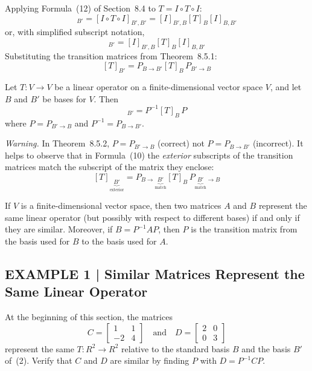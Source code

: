 \documentclass{article}
\begin{document}
Applying Formula~(12) of Section~8.4 to $T = I \circ T \circ I$:
\begin{equation}
  [T]_{B'} = [I \circ T \circ I]_{B',B'} = [I]_{B',B}[T]_B[I]_{B,B'} \tag{8}
\end{equation}
or, with simplified subscript notation,
\begin{equation}
  [T]_{B'} = [I]_{B',B}[T]_B[I]_{B,B'} \tag{9}
\end{equation}
Substituting the transition matrices from Theorem~8.5.1:
\begin{equation}
  \boxed{[T]_{B'} = P_{B\to B'}[T]_B\, P_{B'\to B}} \tag{10}
\end{equation}

\begin{tcolorbox}[colback=red!4, colframe=red!60!black,
  title={\textbf{Theorem 8.5.2}}, boxrule=0.5mm, arc=3mm]
Let $T : V \to V$ be a linear operator on a finite-dimensional vector space $V$, and let
$B$ and $B'$ be bases for $V$. Then
\begin{equation}
  [T]_{B'} = P^{-1}[T]_B\, P \tag{11}
\end{equation}
where $P = P_{B'\to B}$ and $P^{-1} = P_{B\to B'}$.
\end{tcolorbox}

\textit{Warning.} In Theorem~8.5.2, $P = P_{B'\to B}$ (correct) not $P = P_{B\to B'}$
(incorrect). It helps to observe that in Formula~(10) the \emph{exterior} subscripts of
the transition matrices match the subscript of the matrix they enclose:
\[
  [T]_{\underbrace{B'}_{\text{exterior}}}
  = P_{B\to \underbrace{B'}_{\text{match}}}[T]_B\,
    P_{\underbrace{B'}_{\text{match}}\to B}
\]

\begin{tcolorbox}[colback=red!4, colframe=red!60!black,
  title={\textbf{Theorem 8.5.3}}, boxrule=0.5mm, arc=3mm]
If $V$ is a finite-dimensional vector space, then two matrices $A$ and $B$ represent the
same linear operator (but possibly with respect to different bases) if and only if they
are similar. Moreover, if $B = P^{-1}AP$, then $P$ is the transition matrix from the
basis used for $B$ to the basis used for $A$.
\end{tcolorbox}

\subsection*{EXAMPLE 1 | Similar Matrices Represent the Same Linear Operator}

At the beginning of this section, the matrices
\[
  C = \begin{bmatrix}1&1\\-2&4\end{bmatrix} \quad\text{and}\quad
  D = \begin{bmatrix}2&0\\0&3\end{bmatrix}
\]
represent the same $T : R^2 \to R^2$ relative to the standard basis $B$ and the basis
$B'$ of~(2). Verify that $C$ and $D$ are similar by finding $P$ with $D = P^{-1}CP$.
\end{document}
